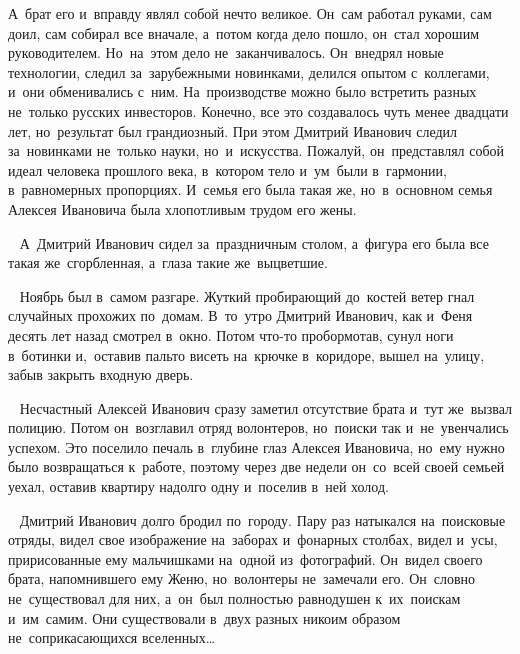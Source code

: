 А~брат его и~вправду являл собой нечто великое.
Он~сам работал руками, сам доил, сам собирал все вначале, а~потом когда дело пошло, он~стал хорошим руководителем.
Но~на~этом дело не~заканчивалось.
Он~внедрял новые технологии, следил за~зарубежными новинками, делился опытом с~коллегами, и~они обменивались с~ним.
На~производстве можно было встретить разных не~только русских инвесторов.
Конечно, все это создавалось чуть менее двадцати лет, но~результат был грандиозный.
При этом Дмитрий Иванович следил за~новинками не~только науки, но~и~искусства.
Пожалуй, он~представлял собой идеал человека прошлого века, в~котором тело и~ум~были в~гармонии, в~равномерных пропорциях.
И~семья его была такая же, но~в~основном семья Алексея Ивановича была хлопотливым трудом его жены.

~
А~Дмитрий Иванович сидел за~праздничным столом, а~фигура его была все такая же~сгорбленная, а~глаза такие же~выцветшие.

~
Ноябрь был в~самом разгаре.
Жуткий пробирающий до~костей ветер гнал случайных прохожих по~домам.
В~то~утро Дмитрий Иванович, как и~Феня десять лет назад смотрел в~окно.
Потом что-то пробормотав, сунул ноги в~ботинки и,~оставив пальто висеть на~крючке в~коридоре, вышел на~улицу, забыв закрыть входную дверь.

~
Несчастный Алексей Иванович сразу заметил отсутствие брата и~тут же~вызвал полицию.
Потом он~возглавил отряд волонтеров, но~поиски так и~не~увенчались успехом.
Это поселило печаль в~глубине глаз Алексея Ивановича, но~ему нужно было возвращаться к~работе, поэтому через две недели он~со~всей своей семьей уехал, оставив квартиру надолго одну и~поселив в~ней холод.

~
Дмитрий Иванович долго бродил по~городу.
Пару раз натыкался на~поисковые отряды, видел свое изображение на~заборах и~фонарных столбах, видел и~усы, пририсованные ему мальчишками на~одной из~фотографий.
Он~видел своего брата, напомнившего ему Женю, но~волонтеры не~замечали его.
Он~словно не~существовал для них, а~он~был полностью равнодушен к~их~поискам и~им~самим.
Они существовали в~двух разных никоим образом не~соприкасающихся вселенных…
 
